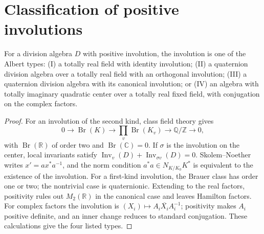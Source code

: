 
\section{Classification of positive involutions}
\label{mumford-IV21-classification-source}

\begin{theorem}
\label{mumford-thm-positive-involution-classification}
For a division algebra $D$ with positive involution, the involution is one of
the Albert types: (I) a totally real field with identity involution; (II)
a quaternion division algebra over a totally real field with an orthogonal
involution; (III) a quaternion division algebra with its canonical
involution; or (IV) an algebra with totally imaginary quadratic center over
a totally real fixed field, with conjugation on the complex factors.
\end{theorem}
\begin{proof}
For an involution of the second kind, class field theory gives
\[
0\to\operatorname{Br}(K)\to\prod_v\operatorname{Br}(K_v)
\to\mathbb Q/\mathbb Z\to0,
\]
with $\operatorname{Br}(\mathbb R)$ of order two and
$\operatorname{Br}(\mathbb C)=0$. If $\sigma$ is the involution on the
center, local invariants satisfy
$\operatorname{Inv}_v(D)+\operatorname{Inv}_{\sigma v}(D)=0$.
Skolem--Noether writes $x'=ax^*a^{-1}$, and the norm condition
$a^*a\in N_{K/K_0}K^*$ is equivalent to the existence of the involution.
For a first-kind involution, the Brauer class has order one or two; the
nontrivial case is quaternionic. Extending to the real factors, positivity
rules out $M_2(\mathbb R)$ in the canonical case and leaves Hamilton factors.
For complex factors the involution is $(X_i)\mapsto
A_i\overline{X_i}A_i^{-1}$; positivity makes $A_i$ positive definite,
and an inner change reduces to standard conjugation. These calculations give
the four listed types.
\end{proof}

